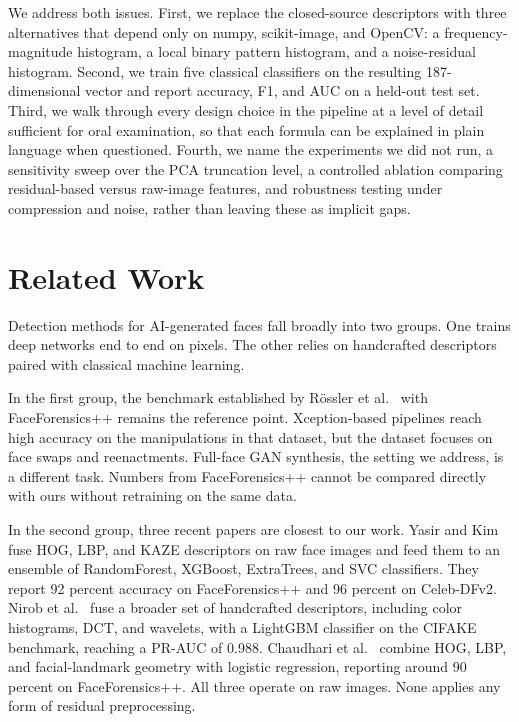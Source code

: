 \documentclass[runningheads]{llncs}
\begin{document}
We address both issues. First, we replace the closed-source descriptors with three alternatives that depend only on numpy, scikit-image, and OpenCV: a frequency-magnitude histogram, a local binary pattern histogram, and a noise-residual histogram. Second, we train five classical classifiers on the resulting 187-dimensional vector and report accuracy, F1, and AUC on a held-out test set. Third, we walk through every design choice in the pipeline at a level of detail sufficient for oral examination, so that each formula can be explained in plain language when questioned. Fourth, we name the experiments we did not run, a sensitivity sweep over the PCA truncation level, a controlled ablation comparing residual-based versus raw-image features, and robustness testing under compression and noise, rather than leaving these as implicit gaps.


\section{Related Work}

Detection methods for AI-generated faces fall broadly into two groups. One trains deep networks end to end on pixels. The other relies on handcrafted descriptors paired with classical machine learning.

In the first group, the benchmark established by R\"{o}ssler et al.~\cite{rossler2019} with FaceForensics++ remains the reference point. Xception-based pipelines reach high accuracy on the manipulations in that dataset, but the dataset focuses on face swaps and reenactments. Full-face GAN synthesis, the setting we address, is a different task. Numbers from FaceForensics++ cannot be compared directly with ours without retraining on the same data.

In the second group, three recent papers are closest to our work. Yasir and Kim~\cite{yasir2025} fuse HOG, LBP, and KAZE descriptors on raw face images and feed them to an ensemble of RandomForest, XGBoost, ExtraTrees, and SVC classifiers. They report 92 percent accuracy on FaceForensics++ and 96 percent on Celeb-DFv2. Nirob et al.~\cite{nirob2026} fuse a broader set of handcrafted descriptors, including color histograms, DCT, and wavelets, with a LightGBM classifier on the CIFAKE benchmark, reaching a PR-AUC of 0.988. Chaudhari et al.~\cite{chaudhari2026} combine HOG, LBP, and facial-landmark geometry with logistic regression, reporting around 90 percent on FaceForensics++. All three operate on raw images. None applies any form of residual preprocessing.
\end{document}
